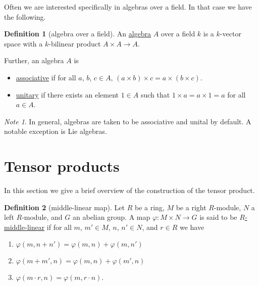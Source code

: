 \documentclass[a4paper]{report}
\newcommand{\defn}[1]{\ul{#1}}
\theoremstyle{definition}
\newtheorem{definition}{Definition}[section]
\theoremstyle{plain}
\theoremstyle{remark}
\newtheorem{note}{Note}[section]
\begin{document}
Often we are interested specifically in algebras over a field. In that case we have the following.
\begin{definition}[algebra over a field]
  \label{def:algebraoverafield}
  An \defn{algebra} $A$ over a field $k$ is a $k$-vector space with a $k$-bilinear product $A \times A \to A$.

  Further, an algebra $A$ is
  \begin{itemize}
    \item \defn{associative} if for all $a$, $b$, $c \in A$, $(a \times b) \times c = a \times (b \times c)$.

    \item \defn{unitary} if there exists an element $1 \in A$ such that $1 \times a = a \times 1 = a$ for all $a \in A$.
  \end{itemize}
\end{definition}

\begin{note}
  In general, algebras are taken to be associative and unital by default. A notable exception is Lie algebras.
\end{note}


\section{Tensor products}
In this section we give a brief overview of the construction of the tensor product.

\begin{definition}[middle-linear map]
  \label{def:middlelinearmap}
  Let $R$ be a ring, $M$ be a right $R$-module, $N$ a left $R$-module, and $G$ an abelian group. A map $\varphi\colon M \times N \to G$ is said to be \defn{$R$-middle-linear} if for all $m$, $m' \in M$, $n$, $n' \in N$, and $r \in R$ we have
  \begin{enumerate}
    \item $\varphi(m, n + n') = \varphi(m, n) + \varphi(m, n')$
    \item $\varphi(m + m', n) = \varphi(m, n) + \varphi(m', n)$
    \item $\varphi(m \cdot r, n) = \varphi(m, r \cdot n)$.
  \end{enumerate}
\end{definition}
\end{document}
